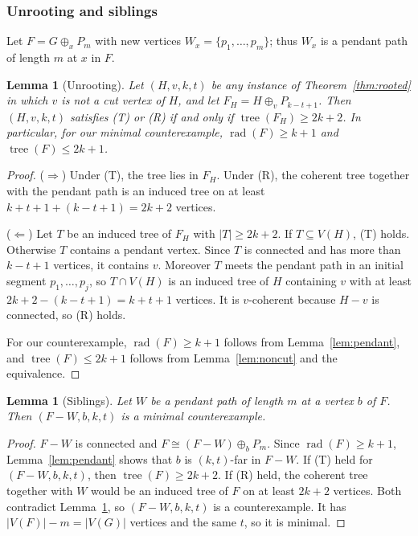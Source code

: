 \documentclass[11pt,a4paper]{article}
\newtheorem{lemma}[theorem]{Lemma}
\theoremstyle{remark}
\newcommand{\rad}{\operatorname{rad}}
\newcommand{\tr}{\tree}
\newcommand{\plus}{\oplus}
\newcommand{\tree}{\operatorname{tree}}
\begin{document}
\subsubsection{Unrooting and siblings}

Let $F=G\plus_x P_m$ with new vertices $W_x=\{p_1,\dots,p_m\}$; thus $W_x$ is a pendant path of length $m$ at $x$ in $F$.

\begin{lemma}[Unrooting]\label{lem:unroot}
Let $(H,v,k,t)$ be any instance of Theorem~\ref{thm:rooted} in which $v$ is not a cut vertex of $H$, and let $F_H=H\plus_v P_{k-t+1}$. Then $(H,v,k,t)$ satisfies (T) or (R) if and only if $\tr(F_H)\ge 2k+2$. In particular, for our minimal counterexample, $\rad(F)\ge k+1$ and $\tr(F)\le 2k+1$.
\end{lemma}

\begin{proof}
($\Rightarrow$) Under (T), the tree lies in $F_H$. Under (R), the coherent tree together with the pendant path is an induced tree on at least $k+t+1+(k-t+1)=2k+2$ vertices.

($\Leftarrow$) Let $T$ be an induced tree of $F_H$ with $|T|\ge2k+2$. If $T\subseteq V(H)$, (T) holds. Otherwise $T$ contains a pendant vertex. Since $T$ is connected and has more than $k-t+1$ vertices, it contains $v$. Moreover $T$ meets the pendant path in an initial segment $p_1,\dots,p_j$, so $T\cap V(H)$ is an induced tree of $H$ containing $v$ with at least $2k+2-(k-t+1)=k+t+1$ vertices. It is $v$-coherent because $H-v$ is connected, so (R) holds.

For our counterexample, $\rad(F)\ge k+1$ follows from Lemma~\ref{lem:pendant}, and $\tr(F)\le2k+1$ follows from Lemma~\ref{lem:noncut} and the equivalence.
\end{proof}

\begin{lemma}[Siblings]\label{lem:sibling}
Let $W$ be a pendant path of length $m$ at a vertex $b$ of $F$. Then $(F-W,b,k,t)$ is a minimal counterexample.
\end{lemma}

\begin{proof}
$F-W$ is connected and $F\cong(F-W)\plus_bP_m$. Since $\rad(F)\ge k+1$, Lemma~\ref{lem:pendant} shows that $b$ is $(k,t)$-far in $F-W$. If (T) held for $(F-W,b,k,t)$, then $\tr(F)\ge2k+2$. If (R) held, the coherent tree together with $W$ would be an induced tree of $F$ on at least $2k+2$ vertices. Both contradict Lemma~\ref{lem:unroot}, so $(F-W,b,k,t)$ is a counterexample. It has $|V(F)|-m=|V(G)|$ vertices and the same $t$, so it is minimal.
\end{proof}
\end{document}
